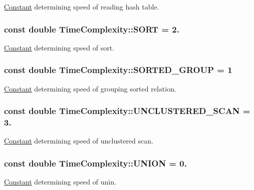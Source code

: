 \hyperlink{class_constant}{Constant} determining speed of reading hash table. \hypertarget{class_time_complexity_ab8e878b2dcc5d2943614849a27e4edbb}{
\subsubsection[{S\+O\+R\+T}]{\setlength{\rightskip}{0pt plus 5cm}const double Time\+Complexity\+::\+S\+O\+R\+T = 2.\hspace{0.3cm}{\ttfamily [static]}}}\label{class_time_complexity_ab8e878b2dcc5d2943614849a27e4edbb}
\hyperlink{class_constant}{Constant} determining speed of sort. \hypertarget{class_time_complexity_ad2ed168a66bfcbd9f5831360e4d6437a}{
\subsubsection[{S\+O\+R\+T\+E\+D\+\_\+\+G\+R\+O\+U\+P}]{\setlength{\rightskip}{0pt plus 5cm}const double Time\+Complexity\+::\+S\+O\+R\+T\+E\+D\+\_\+\+G\+R\+O\+U\+P = 1\hspace{0.3cm}{\ttfamily [static]}}}\label{class_time_complexity_ad2ed168a66bfcbd9f5831360e4d6437a}
\hyperlink{class_constant}{Constant} determining speed of grouping sorted relation. \hypertarget{class_time_complexity_a271a2e8ae589bd80b438ab11908cad02}{
\subsubsection[{U\+N\+C\+L\+U\+S\+T\+E\+R\+E\+D\+\_\+\+S\+C\+A\+N}]{\setlength{\rightskip}{0pt plus 5cm}const double Time\+Complexity\+::\+U\+N\+C\+L\+U\+S\+T\+E\+R\+E\+D\+\_\+\+S\+C\+A\+N = 3.\hspace{0.3cm}{\ttfamily [static]}}}\label{class_time_complexity_a271a2e8ae589bd80b438ab11908cad02}
\hyperlink{class_constant}{Constant} determining speed of unclustered scan. \hypertarget{class_time_complexity_a91493cbef5029bd9aa68e0106c603f6a}{
\subsubsection[{U\+N\+I\+O\+N}]{\setlength{\rightskip}{0pt plus 5cm}const double Time\+Complexity\+::\+U\+N\+I\+O\+N = 0.\hspace{0.3cm}{\ttfamily [static]}}}\label{class_time_complexity_a91493cbef5029bd9aa68e0106c603f6a}
\hyperlink{class_constant}{Constant} determining speed of unin. 

